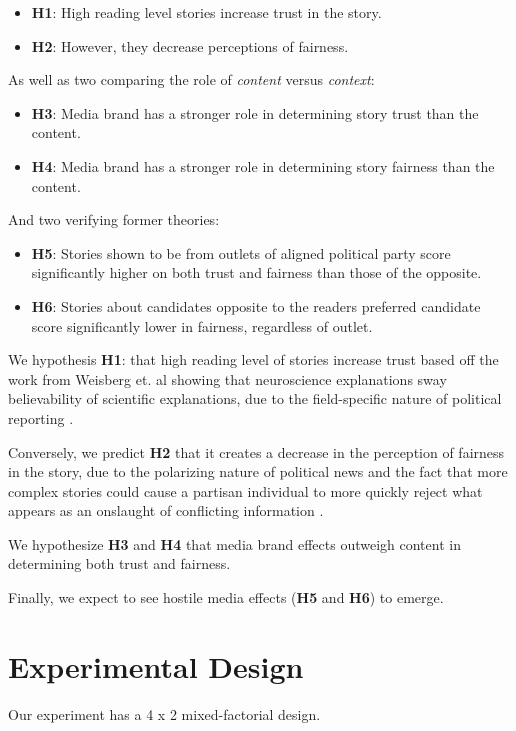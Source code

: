 \begin{itemize}
\item \textbf{H1}: High reading level stories increase trust in the story.
\item \textbf{H2}: However, they decrease perceptions of fairness. 
\end{itemize}

As well as two comparing the role of \emph{content} versus \emph{context}:

\begin{itemize}
\item \textbf{H3}: Media brand has a stronger role in determining story trust than the content. 
\item \textbf{H4}: Media brand has a stronger role in determining story fairness than the content.
\end{itemize}

And two verifying former theories:
\begin{itemize}
\item \textbf{H5}: Stories shown to be from outlets of aligned political party score significantly higher on both trust and fairness than those of the opposite.
\item \textbf{H6}: Stories about candidates opposite to the readers preferred candidate score significantly lower in fairness, regardless of outlet.
\end{itemize}

We hypothesis \textbf{H1}: that high reading level of stories increase trust based off the work from Weisberg et. al showing that neuroscience explanations sway believability of scientific explanations, due to the field-specific nature of political reporting \cite{weisberg2008seductive}.

Conversely, we predict \textbf{H2} that it creates a decrease in the perception of fairness in the story, due to the polarizing nature of political news and the fact that more complex stories could cause a partisan individual to more quickly reject what appears as an onslaught of conflicting information \cite{cacioppo1979effects}.
 
 We hypothesize \textbf{H3} and \textbf{H4} that media brand effects outweigh content in determining both trust and fairness.

 Finally, we expect to see hostile media effects (\textbf{H5} and \textbf{H6}) to emerge.

\section{Experimental Design}
Our experiment has a 4 x 2 mixed-factorial design.
 
